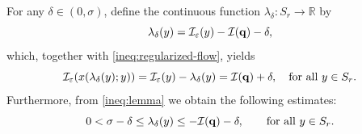 \documentclass{article}
\newcommand{\boI}{\mathcal{I}}
\newcommand{\R}{\mathbb{R}}
\newcommand{\minq}{{\bf q}}
\theoremstyle{definition}
\begin{document}
For any $\delta\in(0,\sigma)$, define the continuous function $\lambda_\delta:S_r\to\R$ by
\begin{equation}\label{def:lambda}
\lambda_\delta(y)=\boI_\varepsilon(y)-\boI(\minq)-\delta,
\end{equation}
which, together with \eqref{ineq:regularized-flow}, yields
\begin{equation}\label{eq:charact-lambda-flow}
\boI_\varepsilon(x(\lambda_\delta(y);y))=\boI_\varepsilon(y)-\lambda_\delta(y)=\boI(\minq)+\delta,\quad\hbox{for all }y\in S_r.
\end{equation}
Furthermore, from \eqref{ineq:lemma} we obtain the following estimates:
\begin{equation}\label{eq:lambda-bounds}
	0<\sigma-\delta\leq\lambda_\delta(y)\leq -\boI(\minq)-\delta,\qquad\hbox{for all }y\in S_r.
\end{equation}
\end{document}
